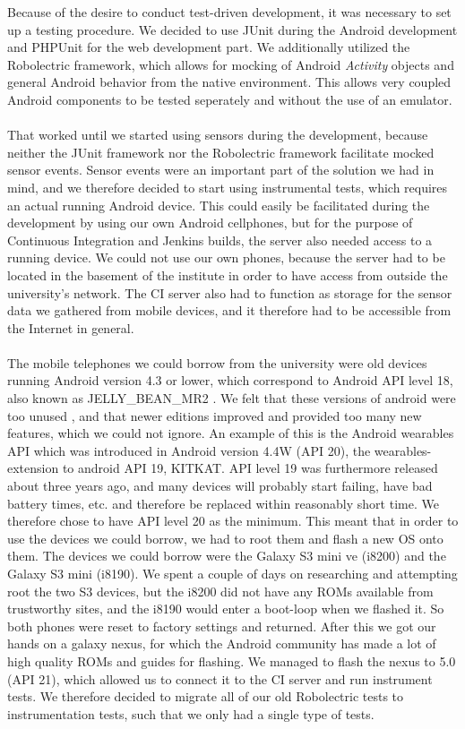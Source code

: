 Because of the desire to conduct test-driven development, it was necessary to set up a testing procedure. We decided to use JUnit during the Android development and PHPUnit for the web development part. We additionally utilized the Robolectric framework, which allows for mocking of Android \emph{Activity} objects and general Android behavior from the native environment. This allows very coupled Android components to be tested seperately and without the use of an emulator. 
\\\\
That worked until we started using sensors during the development, because neither the JUnit framework nor the Robolectric framework facilitate mocked sensor events. Sensor events were an important part of the solution we had in mind, and we therefore decided to start using instrumental tests, which requires an actual running Android device. This could easily be facilitated during the development by using our own Android cellphones, but for the purpose of Continuous Integration and Jenkins builds, the server also needed access to a running device. We could not use our own phones, because the server had to be located in the basement of the institute in order to have access from outside the university's network. The CI server also had to function as storage for the sensor data we gathered from mobile devices, and it therefore had to be accessible from the Internet in general.
\\\\
The mobile telephones we could borrow from the university were old devices running Android version 4.3 or lower, which correspond to Android API level 18, also known as JELLY\_BEAN\_MR2 \parencite{uses_sdk}. We felt that these versions of android were too unused \parencite{android_dashboard}, and that newer editions improved and provided too many new features, which we could not ignore. An example of this is the Android wearables API which was introduced in Android version 4.4W (API 20), the wearables-extension to android API 19, KITKAT. API level 19 was furthermore released about three years ago, and many devices will probably start failing, have bad battery times, etc. and therefore be replaced within reasonably short time. We therefore chose to have API level 20 as the minimum. This meant that in order to use the devices we could borrow, we had to root them and flash a new OS onto them. The devices we could borrow were the Galaxy S3 mini ve (i8200) and the Galaxy S3 mini (i8190). We spent a couple of days on researching and attempting root the two S3 devices, but the i8200 did not have any ROMs available from trustworthy sites, and the i8190 would enter a boot-loop when we flashed it. So both phones were reset to factory settings and returned. After this we got our hands on a galaxy nexus, for which the Android community has made a lot of high quality ROMs and guides for flashing. We managed to flash the nexus to 5.0 (API 21), which allowed us to connect it to the CI server and run instrument tests. We therefore decided to migrate all of our old Robolectric tests to instrumentation tests, such that we only had a single type of tests.